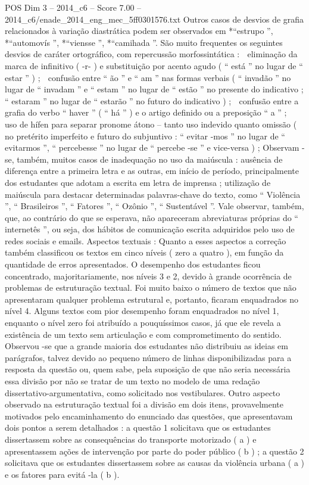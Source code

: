 \begin{textsample}{POS Dim 3 – 2014\_c6 – Score 7.00 – 2014\_c6/enade\_2014\_eng\_mec\_5ff0301576.txt}
Outros casos de desvios de grafia relacionados à variação diastrática podem ser observados em *“estrupo ”, *“automovís ”, *“viensse ”, *“camihada ”.
São muito frequentes os seguintes desvios de caráter ortográfico, com repercussão morfossintática :  eliminação da marca de infinitivo ( -r- ) e substituição por acento agudo ( “ está ” no lugar de “ estar ” ) ;  confusão entre “ ão ” e “ am ” nas formas verbais ( “ invadão ” no lugar de “ invadam ” e “ estam ” no lugar de “ estão ” no presente do indicativo ; “ estaram ” no lugar de “ estarão ” no futuro do indicativo ) ;  confusão entre a grafia do verbo “ haver ” ( “ há ” ) e o artigo definido ou a preposição “ a ” ;  uso de hífen para separar pronome átono – tanto uso indevido quanto omissão ( no pretérito imperfeito e futuro do subjuntivo : “ evitar -mos ” no lugar de “ evitarmos ”, “ percebesse ” no lugar de “ percebe -se ” e vice-versa ) ; Observam -se, também, muitos casos de inadequação no uso da maiúscula : ausência de diferença entre a primeira letra e as outras, em início de período, principalmente dos estudantes que adotam a escrita em letra de imprensa ; utilização de maiúscula para destacar determinadas palavras-chave do texto, como “ Violência ”, “ Brasileiros ”, “ Fatores ”, “ Ozônio ”, “ Sustentável ”.
Vale observar, também, que, ao contrário do que se esperava, não apareceram abreviaturas próprias do “ internetês ”, ou seja, dos hábitos de comunicação escrita adquiridos pelo uso de redes sociais e emails.
Aspectos textuais : Quanto a esses aspectos a correção também classificou os textos em cinco níveis ( zero a quatro ), em função da quantidade de erros apresentados.
O desempenho dos estudantes ficou concentrado, majoritariamente, nos níveis 3 e 2, devido à grande ocorrência de problemas de estruturação textual.
Foi muito baixo o número de textos que não apresentaram qualquer problema estrutural e, portanto, ficaram enquadrados no nível 4.
Alguns textos com pior desempenho foram enquadrados no nível 1, enquanto o nível zero foi atribuído a pouquíssimos casos, já que ele revela a existência de um texto sem articulação e com comprometimento do sentido.
Observou -se que a grande maioria dos estudantes não distribuiu as ideias em parágrafos, talvez devido ao pequeno número de linhas disponibilizadas para a resposta da questão ou, quem sabe, pela suposição de que não seria necessária essa divisão por não se tratar de um texto no modelo de uma redação dissertativo-argumentativa, como solicitado nos vestibulares.
Outro aspecto observado na estruturação textual foi a divisão em dois itens, provavelmente motivados pelo encaminhamento do enunciado das questões, que apresentavam dois pontos a serem detalhados : a questão 1 solicitava que os estudantes dissertassem sobre as consequências do transporte motorizado ( a ) e apresentassem ações de intervenção por parte do poder público ( b ) ; a questão 2 solicitava que os estudantes dissertassem sobre as causas da violência urbana ( a ) e os fatores para evitá -la ( b ).

\end{textsample}
